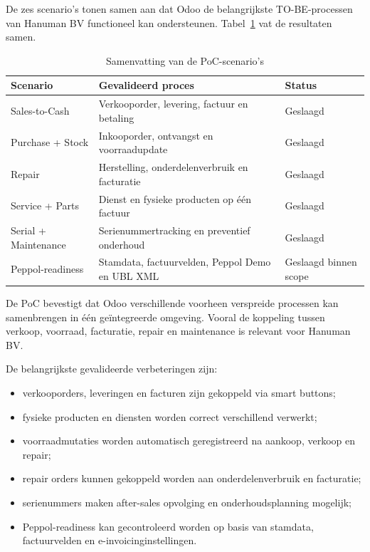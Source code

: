 De zes scenario's tonen samen aan dat Odoo de belangrijkste TO-BE-processen van Hanuman BV functioneel kan ondersteunen. Tabel~\ref{tab:poc-summary} vat de resultaten samen.

\begin{table}[H]
    \centering
    \caption{Samenvatting van de PoC-scenario's}
    \label{tab:poc-summary}
    \begin{tabular}{p{}p{}p{}}
        \toprule
        \textbf{Scenario} & \textbf{Gevalideerd proces} & \textbf{Status} \\
        \midrule
        Sales-to-Cash & Verkooporder, levering, factuur en betaling & Geslaagd \\
        Purchase + Stock & Inkooporder, ontvangst en voorraadupdate & Geslaagd \\
        Repair & Herstelling, onderdelenverbruik en facturatie & Geslaagd \\
        Service + Parts & Dienst en fysieke producten op één factuur & Geslaagd \\
        Serial + Maintenance & Serienummertracking en preventief onderhoud & Geslaagd \\
        Peppol-readiness & Stamdata, factuurvelden, Peppol Demo en UBL XML & Geslaagd binnen scope \\
        \bottomrule
    \end{tabular}
\end{table}

De PoC bevestigt dat Odoo verschillende voorheen verspreide processen kan samenbrengen in één geïntegreerde omgeving. Vooral de koppeling tussen verkoop, voorraad, facturatie, repair en maintenance is relevant voor Hanuman BV.

De belangrijkste gevalideerde verbeteringen zijn:

\begin{itemize}
    \item verkooporders, leveringen en facturen zijn gekoppeld via smart buttons;
    \item fysieke producten en diensten worden correct verschillend verwerkt;
    \item voorraadmutaties worden automatisch geregistreerd na aankoop, verkoop en repair;
    \item repair orders kunnen gekoppeld worden aan onderdelenverbruik en facturatie;
    \item serienummers maken after-sales opvolging en onderhoudsplanning mogelijk;
    \item Peppol-readiness kan gecontroleerd worden op basis van stamdata, factuurvelden en e-invoicinginstellingen.
\end{itemize}

